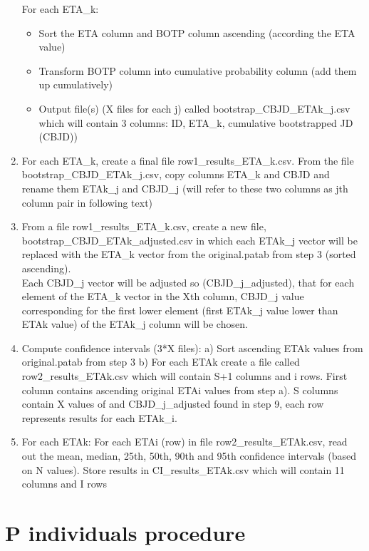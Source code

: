\begin{enumerate}
	For each ETA\_k:
\begin{itemize}
	\item Sort the ETA column and BOTP column ascending (according the ETA value) 
	\item Transform BOTP column into cumulative probability column (add them up cumulatively)
	\item Output file(s) (X files for each j) called bootstrap\_CBJD\_ETAk\_j.csv which will contain 3 	columns: ID, ETA\_k, cumulative bootstrapped JD (CBJD))
\end{itemize}
\item For each ETA\_k, create a final file row1\_results\_ETA\_k.csv. From the file bootstrap\_CBJD\_ETAk\_j.csv, copy columns ETA\_k and CBJD and rename them ETAk\_j and CBJD\_j (will refer to these two columns as jth column pair in following text)
\item From a file row1\_results\_ETA\_k.csv, create a new file,\\ bootstrap\_CBJD\_ETAk\_adjusted.csv in which each ETAk\_j vector will be replaced with the ETA\_k vector from the original.patab from step 3 (sorted ascending).\\Each CBJD\_j vector will be adjusted so (CBJD\_j\_adjusted), that for each element of the ETA\_k vector in the Xth column, CBJD\_j value corresponding for the first lower element (first ETAk\_j value lower than ETAk value) of the ETAk\_j column will be chosen. 
\item Compute confidence intervals (3*X files): a) Sort ascending ETAk values from original.patab from step 3 b) For each ETAk create a file called row2\_results\_ETAk.csv which will contain S+1 columns and i rows. First column contains ascending original ETAi values from step a). S columns contain X values of and CBJD\_j\_adjusted found in step 9, each row represents results for each ETAk\_i.
\item For each ETAk: For each ETAi (row) in file row2\_results\_ETAk.csv, read out the mean, median, 25th, 50th, 90th and 95th confidence intervals (based on N values). Store results in CI\_results\_ETAk.csv which will contain 11 columns and I rows
\end{enumerate}

\section{P individuals procedure}

